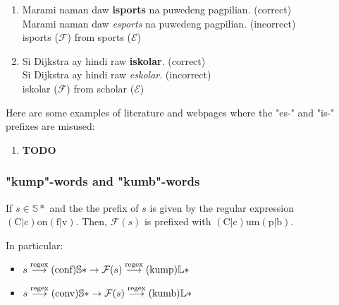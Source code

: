 \begin{enumerate}
      \item Marami naman daw \textbf{isports} na puwedeng pagpilian. (correct) \\
            Marami naman daw \textit{esports} na puwedeng pagpilian. (incorrect) \\
            isports (\(\mathcal{F}\)) from sports (\(\mathcal{E}\))
      \item Si Dijkstra ay hindi raw \textbf{iskolar}. (correct) \\
            Si Dijkstra ay hindi raw \textit{eskolar}. (incorrect) \\
            iskolar (\(\mathcal{F}\)) from scholar (\(\mathcal{E}\))
\end{enumerate}

\begin{example}
      Here are some examples of literature and webpages where the "es-" and "is-"
      prefixes are misused:
\end{example}

\begin{enumerate}
      \item \textbf{TODO}
\end{enumerate}

\subsubsection{"kump"-words and "kumb"-words}

If \(s\in \mathbb{S}*\) and the the prefix of \(s\) is given by the
regular expression \((\text{C}|\text{c})\text{on}(\text{f}|\text{v})\). Then,
\(\mathcal{F}(s)\) is prefixed with
\((\text{C}|\text{c})\text{um}(\text{p}|\text{b})\).

In particular:
\begin{itemize}
      \item \(s \overset{\text{regex}}{\longrightarrow} (\text{conf})\mathbb{S}* \rightarrow \mathcal{F}(s) \overset{\text{regex}}{\longrightarrow} (\text{kump})\mathbb{L}*\)
      \item \(s \overset{\text{regex}}{\longrightarrow} (\text{conv})\mathbb{S}* \rightarrow \mathcal{F}(s) \overset{\text{regex}}{\longrightarrow} (\text{kumb})\mathbb{L}*\)
\end{itemize}

